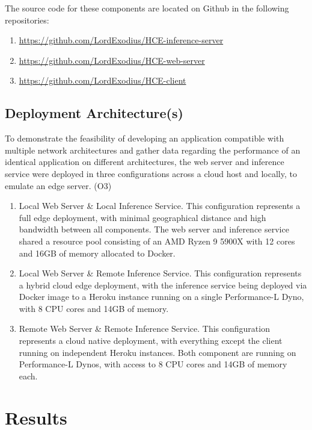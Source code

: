 \documentclass[11pt]{article}
\begin{document}
\noindent The source code for these components are located on Github in the following repositories:
\begin{enumerate}
    \item \url{https://github.com/LordExodius/HCE-inference-server}
    \item \url{https://github.com/LordExodius/HCE-web-server}
    \item \url{https://github.com/LordExodius/HCE-client}
\end{enumerate}

\subsection{Deployment Architecture(s)}
To demonstrate the feasibility of developing an application compatible with multiple network 
architectures and gather data regarding the performance of an identical application on different
architectures, the web server and inference service were deployed in three configurations across 
a cloud host and locally, to emulate an edge server. (O3)

\begin{enumerate}
    \item {
        Local Web Server \& Local Inference Service. This configuration represents a full edge 
        deployment, with minimal geographical distance and high bandwidth between all components.
        The web server and inference service shared a resource pool consisting of an AMD Ryzen 9 5900X
        with 12 cores and 16GB of memory allocated to Docker.
    }
    \item {
        Local Web Server \& Remote Inference Service. This configuration represents a hybrid
        cloud edge deployment, with the inference service being deployed via Docker image to a
        Heroku instance running on a single Performance-L Dyno, with 8 CPU cores and 14GB of memory.
    }
    \item {
        Remote Web Server \& Remote Inference Service. This configuration represents a cloud native
        deployment, with everything except the client running on independent Heroku instances.
        Both component are running on Performance-L Dynos, with access to 8 CPU cores and 14GB of
        memory each.
    }
\end{enumerate}

\newpage
\section{Results}
\end{document}
